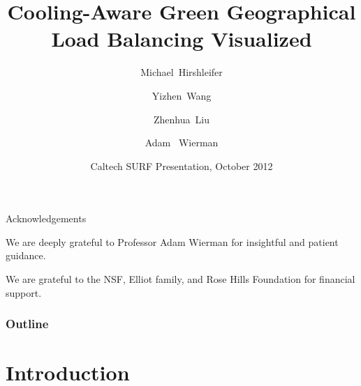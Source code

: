\documentclass[xcolor=dvipsnames]{beamer}
\title{Cooling-Aware  Green Geographical Load Balancing Visualized}
\author[Hirshleifer, Wang, Liu, Wierman] %
{Michael~Hirshleifer\inst{} \and Yizhen~Wang\inst{} \\ \and Zhenhua~Liu \inst{} \and Adam~ Wierman \inst{}}
\institute[Caltech] %
{
  \inst{}%
  California Institute of Technology \\
  1200 E California Blvd \\
   Pasadena, CA 91106 \\
}
\date[Support] %
{Caltech SURF Presentation, October 2012 }
\begin{document}
\frame{\titlepage}

\begin{frame}{Acknowledgements}
	\begin{block}{}  
	We are deeply grateful to Professor Adam Wierman for insightful and patient guidance.

  We are grateful to the NSF, Elliot family, and Rose Hills Foundation for financial support.   
	\end{block}
\end{frame}


\begin{frame}
\frametitle{Outline}
\tableofcontents[part=1,pausesections]
\end{frame}

\section{Introduction}
\end{document}

